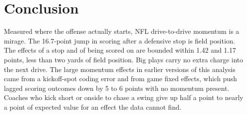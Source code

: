 \documentclass[11pt]{article}
\begin{document}
\section{Conclusion}\label{sec:concl}

Measured where the offense actually starts, NFL drive-to-drive momentum is a mirage. The 16.7-point jump in scoring after a defensive stop is field position. The effects of a stop and of being scored on are bounded within 1.42 and 1.17 points, less than two yards of field position. Big plays carry no extra charge into the next drive. The large momentum effects in earlier versions of this analysis came from a kickoff-spot coding error and from game fixed effects, which push lagged scoring outcomes down by 5 to 6 points with no momentum present. Coaches who kick short or onside to chase a swing give up half a point to nearly a point of expected value for an effect the data cannot find.



\end{document}
